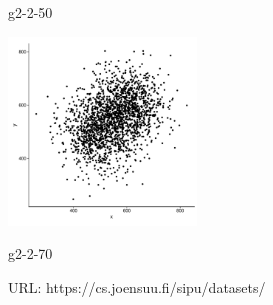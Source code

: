 \documentclass[a4paper,10pt]{article}
\theoremstyle{plain}
\theoremstyle{definition}
\begin{document}
\begin{figure}[H]
\begin{minipage}{5cm}
		\caption*{g2-2-50}
		\label{g2-2-50}
	\end{minipage}
	\begin{minipage}{5cm}
		\includegraphics[width=5cm]{./pictures/G2/g2-2-70.pdf}
		\caption*{g2-2-70}
		\label{g2-2-70}
	\end{minipage}
	
	\caption{URL: https://cs.joensuu.fi/sipu/datasets/}
	\label{fig:g2-combined}
\end{figure}
\end{document}
